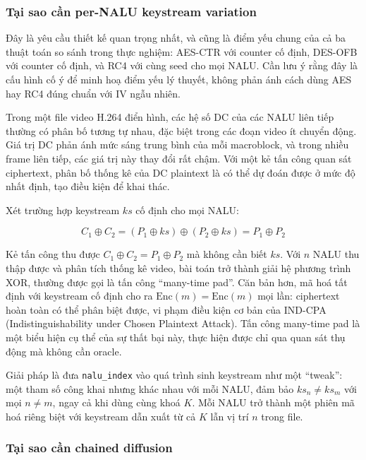 \subsubsection{Tại sao cần per-NALU keystream variation}

Đây là yêu cầu thiết kế quan trọng nhất, và cũng là điểm yếu chung của cả ba thuật toán so sánh trong thực nghiệm: AES-CTR với counter cố định, DES-OFB với counter cố định, và RC4 với cùng seed cho mọi NALU. Cần lưu ý rằng đây là cấu hình cố ý để minh hoạ điểm yếu lý thuyết, không phản ánh cách dùng AES hay RC4 đúng chuẩn với IV ngẫu nhiên.

Trong một file video H.264 điển hình, các hệ số DC của các NALU liên tiếp thường có phân bố tương tự nhau, đặc biệt trong các đoạn video ít chuyển động. Giá trị DC phản ánh mức sáng trung bình của mỗi macroblock, và trong nhiều frame liên tiếp, các giá trị này thay đổi rất chậm. Với một kẻ tấn công quan sát ciphertext, phân bố thống kê của DC plaintext là có thể dự đoán được ở mức độ nhất định, tạo điều kiện để khai thác.

Xét trường hợp keystream $ks$ cố định cho mọi NALU:

\begin{equation}
C_1 \oplus C_2 = (P_1 \oplus ks) \oplus (P_2 \oplus ks) = P_1 \oplus P_2
\end{equation}

Kẻ tấn công thu được $C_1 \oplus C_2 = P_1 \oplus P_2$ mà không cần biết $ks$. Với $n$ NALU thu thập được và phân tích thống kê video, bài toán trở thành giải hệ phương trình XOR, thường được gọi là tấn công ``many-time pad''. Căn bản hơn, mã hoá tất định với keystream cố định cho ra $\text{Enc}(m) = \text{Enc}(m)$ mọi lần: ciphertext hoàn toàn có thể phân biệt được, vi phạm điều kiện cơ bản của IND-CPA (Indistinguishability under Chosen Plaintext Attack). Tấn công many-time pad là một biểu hiện cụ thể của sự thất bại này, thực hiện được chỉ qua quan sát thụ động mà không cần oracle.

Giải pháp là đưa \texttt{nalu\_index} vào quá trình sinh keystream như một ``tweak'': một tham số công khai nhưng khác nhau với mỗi NALU, đảm bảo $ks_n \neq ks_m$ với mọi $n \neq m$, ngay cả khi dùng cùng khoá $K$. Mỗi NALU trở thành một phiên mã hoá riêng biệt với keystream dẫn xuất từ cả $K$ lẫn vị trí $n$ trong file.

\subsubsection{Tại sao cần chained diffusion}

